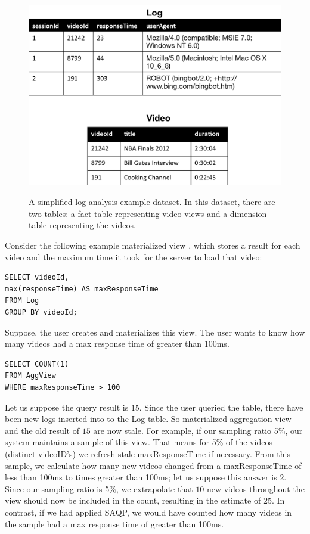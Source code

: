 \begin{figure}[t] 
\centering
 \includegraphics[scale=0.40]{figs/sample-clean-example.png}\label{example-1}
 \caption{A simplified log analysis example dataset. In this dataset, there are two tables: a fact table representing video views and a dimension table representing the videos.}
\end{figure}

Consider the following example materialized view \aggview, which stores a result for each video and the maximum time it took for the server to load that video:
\begin{lstlisting} 
SELECT videoId, 
max(responseTime) AS maxResponseTime 
FROM Log 
GROUP BY videoId;
\end{lstlisting}

Suppose, the user creates and materializes this view.
The user wants to know how many videos had a max response time of greater than 100ms.
\begin{lstlisting} 
SELECT COUNT(1)
FROM AggView
WHERE maxResponseTime > 100
\end{lstlisting}
Let us suppose the query result is $15$.
Since the user queried the table, there have been new logs inserted into to the Log table. 
So materialized aggregation view and the old result of $15$ are now stale.
For example, if our sampling ratio 5\%, our system maintains a sample of this view.
That means for 5\% of the videos (distinct videoID's) we refresh stale maxResponseTime if necessary.
From this sample, we calculate how many new videos changed from a maxResponseTime of less than 100ms to times greater than 100ms; let us suppose this answer is $2$.
Since our sampling ratio is 5\%, we extrapolate that $10$ new videos throughout the view should now be included in the count, resulting in the estimate of $25$.
In contrast, if we had applied SAQP, we would have counted how many videos in the sample had a max response time of greater than 100ms.